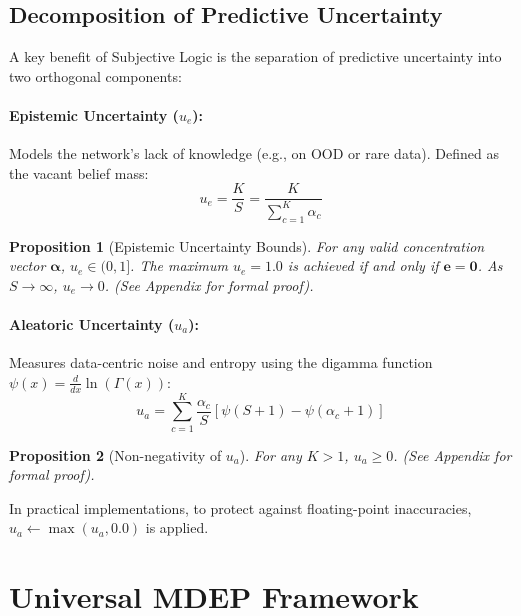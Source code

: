 \documentclass[letterpaper]{article} %
\newtheorem{proposition}{Proposition}
\begin{document}
\subsection{Decomposition of Predictive Uncertainty}\label{subsec:uncertainties}
A key benefit of Subjective Logic is the separation of predictive uncertainty into two orthogonal components:

\paragraph{Epistemic Uncertainty ($u_e$):} Models the network's lack of knowledge (e.g., on OOD or rare data). Defined as the vacant belief mass:
\begin{equation}\label{eq:u_e}
    u_e = \frac{K}{S} = \frac{K}{\sum_{c=1}^K \alpha_c}
\end{equation}
\begin{proposition}[Epistemic Uncertainty Bounds]
For any valid concentration vector $\bm{\alpha}$, $u_e \in (0, 1]$. The maximum $u_e = 1.0$ is achieved if and only if $\bm{e} = \bm{0}$. As $S \to \infty$, $u_e \to 0$. (See Appendix for formal proof).
\end{proposition}

\paragraph{Aleatoric Uncertainty ($u_a$):} Measures data-centric noise and entropy using the digamma function $\psi(x) = \frac{d}{dx} \ln(\Gamma(x))$:
\begin{equation}\label{eq:u_a}
    u_a = \sum_{c=1}^K \frac{\alpha_c}{S} \left[\psi(S + 1) - \psi(\alpha_c + 1)\right]
\end{equation}
\begin{proposition}[Non-negativity of $u_a$]
For any $K > 1$, $u_a \ge 0$. (See Appendix for formal proof).
\end{proposition}
In practical implementations, to protect against floating-point inaccuracies, $u_a \leftarrow \max(u_a, 0.0)$ is applied.


\section{Universal MDEP Framework}\label{sec:methodology}
\end{document}
